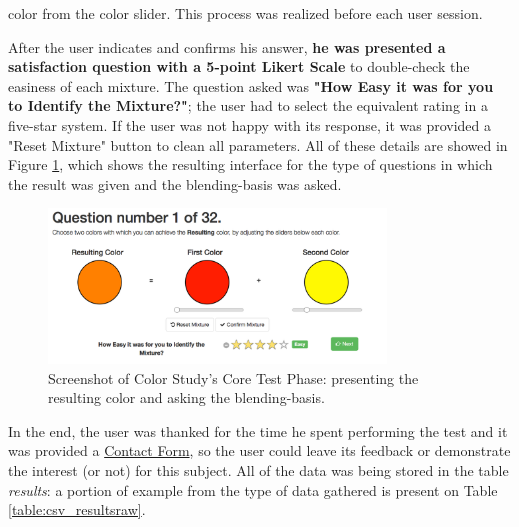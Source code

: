 color from the color slider. This process was realized before each user session. \par
%
After the user indicates and confirms his answer, \textbf{he was presented a satisfaction question with a 5-point Likert Scale} to double-check the easiness
of each mixture. The question asked was \textbf{"How Easy it was for you to Identify the Mixture?"}; the user had to select the equivalent rating in a
five-star system. If the user was not happy with its response, it was provided a "Reset Mixture" button to clean all parameters. All of these details are
showed in Figure \ref{fig:screen_core}, which shows the resulting interface for the type of questions in which the result was given and the blending-basis
was asked. \par
%
\begin{figure}[htbp]
	\centering
  \includegraphics[width=0.8\textwidth]{images/implementation/screen_core.png}
  \caption[Screenshot of Color Study's Core Test Phase: presenting the resulting color and asking the blending-basis.]{Screenshot of
	Color Study's Core Test Phase: presenting the resulting color and asking the blending-basis.}
  \label{fig:screen_core}
\end{figure} \par
%
In the end, the user was thanked for the time he spent performing the test and it was provided a \ul{Contact Form}, so the user could leave its feedback or
demonstrate the interest (or not) for this subject. All of the data was being stored in the table \emph{results}: a portion of example from the type of data
gathered is present on Table \ref{table:csv_resultsraw}. \par
%

